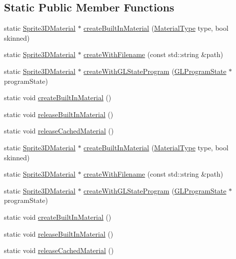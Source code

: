 \subsection*{Static Public Member Functions}
\begin{DoxyCompactItemize}
\item 
static \hyperlink{classSprite3DMaterial}{Sprite3\+D\+Material} $\ast$ \hyperlink{classSprite3DMaterial_a94d990d2049002b37830a4308753ebc0}{create\+Built\+In\+Material} (\hyperlink{classSprite3DMaterial_a2b3cb11be78a5f6332cc01d5b7063e32}{Material\+Type} type, bool skinned)
\item 
static \hyperlink{classSprite3DMaterial}{Sprite3\+D\+Material} $\ast$ \hyperlink{classSprite3DMaterial_a127e29f086848a762afca729d513efbf}{create\+With\+Filename} (const std\+::string \&path)
\item 
static \hyperlink{classSprite3DMaterial}{Sprite3\+D\+Material} $\ast$ \hyperlink{classSprite3DMaterial_a772f63c64eb9c9a8b78d0d7e7b479752}{create\+With\+G\+L\+State\+Program} (\hyperlink{classGLProgramState}{G\+L\+Program\+State} $\ast$program\+State)
\item 
static void \hyperlink{classSprite3DMaterial_a9da378b7126a4d42492b4f9fd2f19528}{create\+Built\+In\+Material} ()
\item 
static void \hyperlink{classSprite3DMaterial_a49b2abc744aa6bdbdc99f095d7e54176}{release\+Built\+In\+Material} ()
\item 
static void \hyperlink{classSprite3DMaterial_a5dd36d74ecdaec81f8d02d66b6543eef}{release\+Cached\+Material} ()
\item 
static \hyperlink{classSprite3DMaterial}{Sprite3\+D\+Material} $\ast$ \hyperlink{classSprite3DMaterial_a44c6d37eb63b3fdfa8c17efba0eb9c10}{create\+Built\+In\+Material} (\hyperlink{classSprite3DMaterial_a2b3cb11be78a5f6332cc01d5b7063e32}{Material\+Type} type, bool skinned)
\item 
static \hyperlink{classSprite3DMaterial}{Sprite3\+D\+Material} $\ast$ \hyperlink{classSprite3DMaterial_ab36bcb7f2afab5bccd5dbe6e7c6e0b98}{create\+With\+Filename} (const std\+::string \&path)
\item 
static \hyperlink{classSprite3DMaterial}{Sprite3\+D\+Material} $\ast$ \hyperlink{classSprite3DMaterial_afbba69490fc572119f6510cacbb31a11}{create\+With\+G\+L\+State\+Program} (\hyperlink{classGLProgramState}{G\+L\+Program\+State} $\ast$program\+State)
\item 
static void \hyperlink{classSprite3DMaterial_a05618c25f5d1244f8d6d2b09a3783e9d}{create\+Built\+In\+Material} ()
\item 
static void \hyperlink{classSprite3DMaterial_ac0a7e0fffdacaa9eca56cd71355eec29}{release\+Built\+In\+Material} ()
\item 
static void \hyperlink{classSprite3DMaterial_af9e4780a7202ba93932e8edd12fea60e}{release\+Cached\+Material} ()
\end{DoxyCompactItemize}
